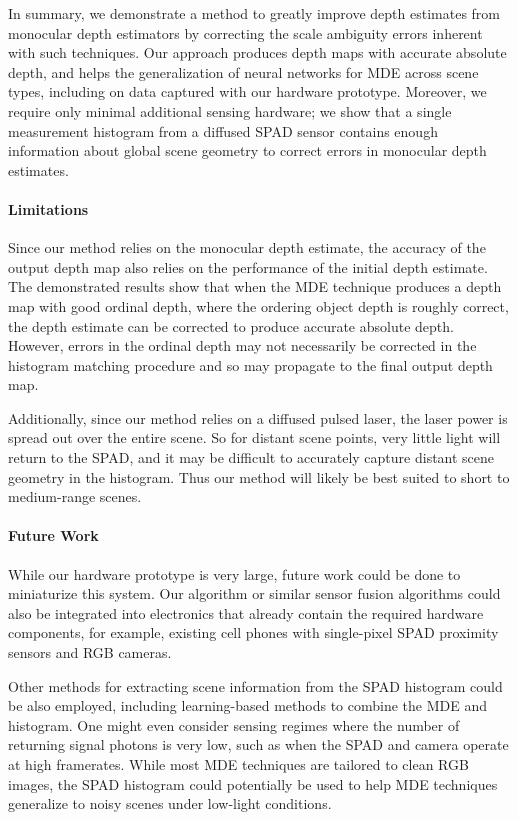 In summary, we demonstrate a method to greatly improve depth estimates from
monocular depth estimators by correcting the scale ambiguity errors inherent
with such techniques.  Our approach produces depth maps with accurate absolute
depth, and helps the generalization of neural networks for MDE across scene
types, including on data captured with our hardware prototype.  Moreover, we
require only minimal additional sensing hardware; we show that a single measurement
histogram from a diffused SPAD sensor contains enough information about global
scene geometry to correct errors in monocular depth estimates.

\paragraph{Limitations}

Since our method relies on the monocular depth estimate, the accuracy of the
output depth map also relies on the performance of the initial depth estimate.
The demonstrated results show that when the MDE technique produces a depth map
with good ordinal depth, where the ordering object depth is roughly correct, the
depth estimate can be corrected to produce accurate absolute depth. However,
errors in the ordinal depth may not necessarily be corrected in the histogram
matching procedure and so may propagate to the final output depth map.

Additionally, since our method relies on a diffused pulsed laser, the laser
power is spread out over the entire scene. So for distant scene points, very
little light will return to the SPAD, and it may be difficult to accurately
capture distant scene geometry in the histogram. Thus our method will likely be
best suited to short to medium-range scenes.

\paragraph{Future Work}
While our hardware prototype is very large, future work could be done to
miniaturize this system. Our algorithm or similar sensor fusion algorithms could
also be integrated into electronics that already contain the required hardware
components, for example, existing cell phones with single-pixel SPAD
proximity sensors and RGB cameras.

Other methods for extracting scene information from the SPAD histogram could be
also employed, including learning-based methods to combine the MDE and
histogram. One might even consider sensing regimes where the number of
returning signal photons is very low, such as when the SPAD and camera operate
at high framerates. While most MDE techniques are tailored to clean RGB images,  
the SPAD histogram could potentially be used to help MDE
techniques generalize to noisy scenes under low-light conditions. 
 


